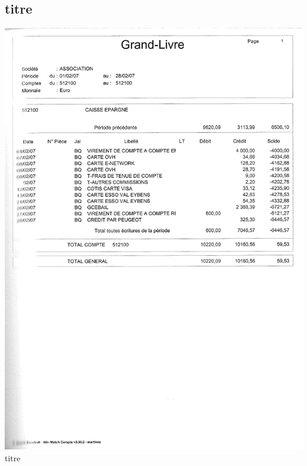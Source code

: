 \subsection{titre}
\begin{center}
\includegraphics[scale=0.6]{annexes/images/grand-livre.pdf} \\
titre
\end{center}
